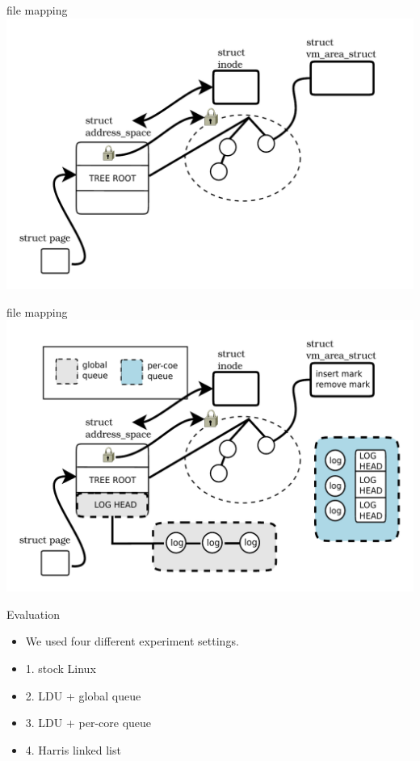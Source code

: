 \documentclass[english]{beamer} %
\begin{document}
\begin{frame}{file mapping}
\includegraphics[scale=0.5]{fig/file_rmap_default}
\end{frame}


\begin{frame}{file mapping}
\includegraphics[scale=0.5]{fig/file_rmap}
\end{frame}



\begin{frame}{Evaluation}
    \begin{itemize}[<+-| alert@+>]
    \item We used four different experiment settings.
    \item 1. stock Linux
    \item 2. LDU + global queue
    \item 3. LDU + per-core queue
    \item 4. Harris linked list
    \end{itemize}
\end{frame}
\end{document}
